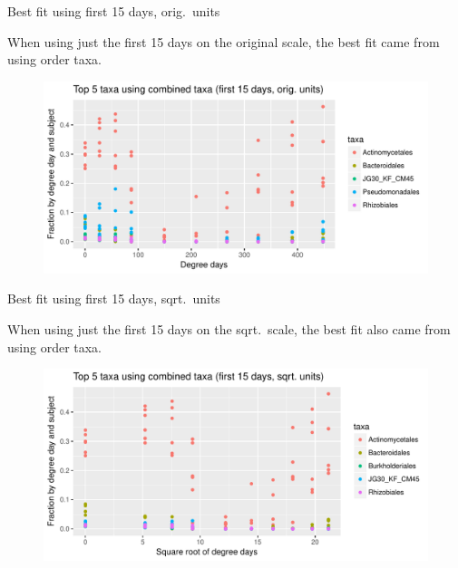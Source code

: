 \documentclass{beamer}
\begin{document}
\begin{frame}{Best fit using first 15 days, orig.~units}
  
  \noindent When using just the first 15 days on the original scale,
  the best fit came from using order taxa.

  \begin{center}
    \begin{figure}
      \includegraphics[width=4.5in]{orders_orig_units_first_two_weeks_top_5_taxa}
    \end{figure}
  \end{center}
  \vspace{-0.25in}
  
\end{frame}



\begin{frame}{Best fit using first 15 days, sqrt.~units}
  
  \noindent When using just the first 15 days on the sqrt.~scale,
  the best fit also came from using order taxa.

  \begin{center}
    \begin{figure}
      \includegraphics[width=4.5in]{orders_sqrt_units_first_two_weeks_top_5_taxa}
    \end{figure}
  \end{center}
  \vspace{-0.25in}
  
\end{frame}

\end{document}
